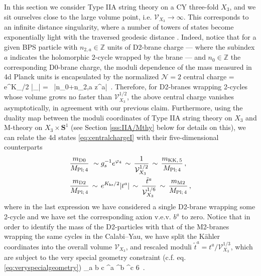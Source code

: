 In this section we consider Type IIA string theory on a CY three-fold $X_3$, and we sit ourselves close to the large volume point, i.e. $\mathcal{V}_{X_3} \to \infty$. This corresponds to an infinite distance singularity, where a number of towers of states become exponentially light with the traversed geodesic distance \cite{Font:2019cxq}. Indeed, notice that for a given BPS particle with $n_{2,a}\in \mathbb{Z}$ units of D2-brane charge --- where the subindex $a$ indicates the holomorphic 2-cycle wrapped by the brane --- and $n_0\in \mathbb{Z}$ the corresponding D0-brane charge, the moduli dependence of the mass measured in 4d Planck units is encapsulated by the normalized $\mathcal{N}=2$ central charge
%
\beq\label{eq:centralchargeI}
		 = \sqrt{8\pi } e^{K_{}/2} |_{}| = \, |n_0+n_{2,a} z^a|\, .
\eeq
%
Therefore, for D2-branes wrapping 2-cycles whose volume grows no faster than $\mathcal{V}_{X_3}^{1/2}$, the above central charge vanishes asymptotically, in agreement with our previous claim. Furthermore, using the duality map between the moduli coordinates of Type IIA string theory on $X_3$ and M-theory on $X_3 \times \mathbf{S}^1$ (see Section \ref{sss:IIA/Mthy} below for details on this), we can relate the 4d states \eqref{eq:centralchargeI} with their five-dimensional counterparts
%
\begin{equation}\label{eq:massesD0D2Emergence}
	 \begin{aligned}
				\frac{m_{\text{D0}}}{M_{\text{Pl;}\, 4}}\, &\, \sim g_s^{-1} e^{\varphi_4}\, \sim\, \frac{1}{\mathcal{V}_{X_3}^{1/2}}\, \sim\, \frac{m_{\text{KK},\, 5}}{M_{\text{Pl;}\, 4}}\, ,\\
				\frac{m_{\text{D2}}}{M_{\text{Pl;}\, 4}}\, & \sim\, e^{K_{\text{ks}}/2} |t^a|\, \sim\, \frac{\tilde{t}^a}{\mathcal{V}_{X_3}^{1/6}}\, \sim\, \frac{m_{\text{M2}}}{M_{\text{Pl;}\, 4}}\, ,
	 \end{aligned}
\end{equation}
%
where in the last expression we have considered a single D2-brane wrapping some 2-cycle and we have set the corresponding axion v.e.v. $b^a$ to zero. Notice that in order to identify the mass of the D2-particles with that of the M2-branes wrapping the same cycles in the Calabi--Yau, we have split the K\"ahler coordinates into the overall volume $\mathcal{V}_{X_3}$, and rescaled moduli $\tilde{t}^a=t^a/\mathcal{V}_{X_3}^{1/3}$, which are subject to the very special geometry constraint (c.f. eq. \eqref{eq:veryspecialgeometry})
%
\beq
 _{a b c} ^a ^b ^c \stackrel{!}{=} 6\, .
